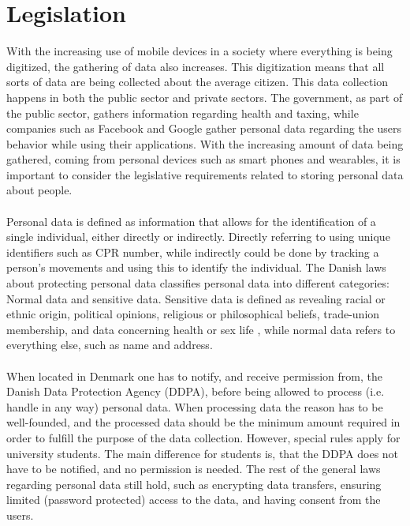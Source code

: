 
\section{Legislation}
\label{sec:legislation}

With the increasing use of mobile devices in a society where everything is being digitized, the gathering of data also increases. This digitization means that all sorts of data are being collected about the average citizen. This data collection happens in both the public sector and private sectors. The government, as part of the public sector, gathers information regarding health and taxing, while companies such as Facebook and Google gather personal data regarding the users behavior while using their applications. With the increasing amount of data being gathered, coming from personal devices such as smart phones and wearables, it is important to consider the legislative requirements related to storing personal data about people.
\\\\
Personal data is defined as information that allows for the identification of a single individual, either directly or indirectly. Directly referring to using unique identifiers such as CPR number, while indirectly could be done by tracking a person's movements and using this to identify the individual. The Danish laws about protecting personal data classifies personal data into different categories: Normal data and sensitive data. Sensitive data is defined as revealing racial or ethnic origin, political opinions, religious or philosophical beliefs, trade-union membership, and data concerning health or sex life \parencite{datatilsynet_stud1}, while normal data refers to everything else, such as name and address.  
\\\\
When located in Denmark one has to notify, and receive permission from, the Danish Data Protection Agency (DDPA), before being allowed to process (i.e. handle in any way) personal data. When processing data the reason has to be well-founded, and the processed data should be the minimum amount required in order to fulfill the purpose of the data collection. However, special rules apply for university students. The main difference for students is, that the DDPA does not have to be notified, and no permission is needed. The rest of the general laws regarding personal data still hold, such as encrypting data transfers, ensuring limited (password protected) access to the data, and having consent from the users. 
